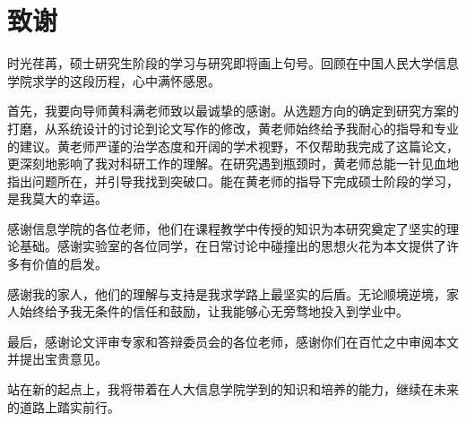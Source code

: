 \newpage
{}
\section*{致谢}

时光荏苒，硕士研究生阶段的学习与研究即将画上句号。回顾在中国人民大学信息学院求学的这段历程，心中满怀感恩。

首先，我要向导师黄科满老师致以最诚挚的感谢。从选题方向的确定到研究方案的打磨，从系统设计的讨论到论文写作的修改，黄老师始终给予我耐心的指导和专业的建议。黄老师严谨的治学态度和开阔的学术视野，不仅帮助我完成了这篇论文，更深刻地影响了我对科研工作的理解。在研究遇到瓶颈时，黄老师总能一针见血地指出问题所在，并引导我找到突破口。能在黄老师的指导下完成硕士阶段的学习，是我莫大的幸运。

感谢信息学院的各位老师，他们在课程教学中传授的知识为本研究奠定了坚实的理论基础。感谢实验室的各位同学，在日常讨论中碰撞出的思想火花为本文提供了许多有价值的启发。

感谢我的家人，他们的理解与支持是我求学路上最坚实的后盾。无论顺境逆境，家人始终给予我无条件的信任和鼓励，让我能够心无旁骛地投入到学业中。

最后，感谢论文评审专家和答辩委员会的各位老师，感谢你们在百忙之中审阅本文并提出宝贵意见。

站在新的起点上，我将带着在人大信息学院学到的知识和培养的能力，继续在未来的道路上踏实前行。
